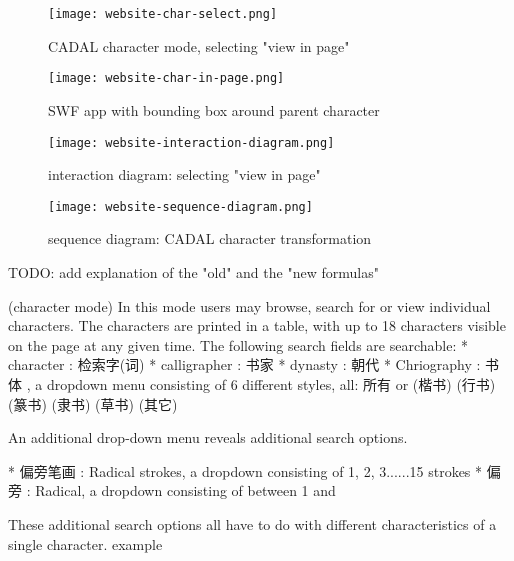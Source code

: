             
    \begin{figure}{}
    \parbox{12cm}{\texttt{[image: website-char-select.png]}}
    \caption{CADAL character mode, selecting "view in page"}
    \label{Character table in CADAL}
    \end{figure}
    
    \begin{figure}{}
    \parbox{12cm}{\texttt{[image: website-char-in-page.png]}}
    \caption{SWF app with bounding box around parent character}
    \label{Viewing character bounding box from cadal}
    \end{figure}
    
    \begin{figure}{}
    \parbox{12cm}{\texttt{[image: website-interaction-diagram.png]}}
    \caption{interaction diagram: selecting "view in page"}
    \label{CADAL website interaction diagram}
    \end{figure}
    
        \begin{figure}{}
    \parbox{12cm}{\texttt{[image: website-sequence-diagram.png]}}
    \caption{sequence diagram: CADAL character transformation }
    \label{CADAL website sequence diagram}
    \end{figure}
    
    
    
    TODO: add explanation of the "old" and the "new formulas"
    
    (character mode)
        In this mode users may browse, search for or view individual characters.  The characters are printed in a table, with up to 18 characters visible on the page at any given time.  The following search fields are searchable:
            * character : 检索字(词)
            * calligrapher :  书家
            * dynasty :  朝代
            * Chriography :  书体 , a dropdown menu consisting of 6 different styles, all: 所有 or (楷书) (行书) (篆书) (隶书) (草书) (其它)
            
            An additional drop-down menu reveals additional search options.
            
            * 偏旁笔画 : Radical strokes, a dropdown consisting of 1, 2, 3......15 strokes
            *  偏旁 : Radical, a dropdown consisting of between 1 and 
            
            
            These additional search options all have to do with different characteristics of a single character.  example


